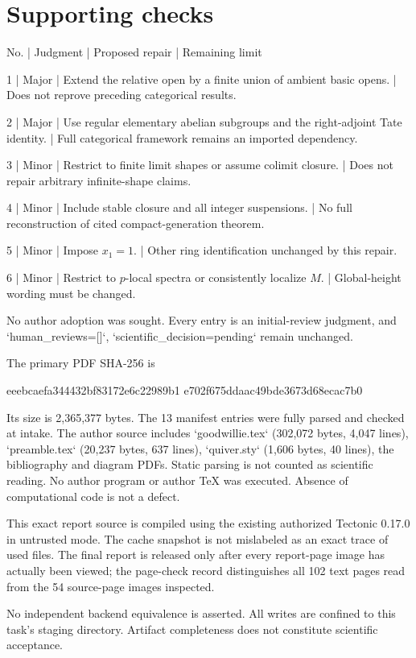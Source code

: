 \documentclass[10pt]{article}
\begin{document}
\section*{Supporting checks}
No. | Judgment | Proposed repair | Remaining limit\par
1 | Major | Extend the relative open by a finite union of ambient basic opens. | Does not reprove preceding categorical results.\par
2 | Major | Use regular elementary abelian subgroups and the right-adjoint Tate identity. | Full categorical framework remains an imported dependency.\par
3 | Minor | Restrict to finite limit shapes or assume colimit closure. | Does not repair arbitrary infinite-shape claims.\par
4 | Minor | Include stable closure and all integer suspensions. | No full reconstruction of cited compact-generation theorem.\par
5 | Minor | Impose \(x_1=1\). | Other ring identification unchanged by this repair.\par
6 | Minor | Restrict to \(p\)-local spectra or consistently localize \(M\). | Global-height wording must be changed.\par
No author adoption was sought. Every entry is an initial-review judgment, and `human\_reviews=[]`, `scientific\_decision=pending` remain unchanged.\par
The primary PDF SHA-256 is\par
eeebcaefa344432bf83172e6c22989b1
e702f675ddaac49bde3673d68ecac7b0\par
Its size is 2,365,377 bytes. The 13 manifest entries were fully parsed and checked at intake. The author source includes `goodwillie.tex` (302,072 bytes, 4,047 lines), `preamble.tex` (20,237 bytes, 637 lines), `quiver.sty` (1,606 bytes, 40 lines), the bibliography and diagram PDFs. Static parsing is not counted as scientific reading. No author program or author TeX was executed. Absence of computational code is not a defect.\par
This exact report source is compiled using the existing authorized Tectonic 0.17.0 in untrusted mode. The cache snapshot is not mislabeled as an exact trace of used files. The final report is released only after every report-page image has actually been viewed; the page-check record distinguishes all 102 text pages read from the 54 source-page images inspected.\par
No independent backend equivalence is asserted. All writes are confined to this task’s staging directory. Artifact completeness does not constitute scientific acceptance.\par
\end{document}
